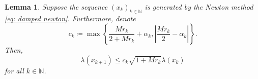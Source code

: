 \documentclass[sn-mathphys-num]{sn-jnl}%
\newcommand{\N}{\mathbb{N}}
\theoremstyle{thmstyleone}%
\newtheorem{lemma}{Lemma}[section]
\theoremstyle{thmstyletwo}%
\theoremstyle{thmstylethree}%
\numberwithin{equation}{section}
\begin{document}
\begin{lemma} \label{lemma: newton's progress lambda}
Suppose the sequence $(x_k)_{k \in \N}$ is generated by the Newton method \eqref{eq: damped newton}. Furthermore, denote 
    \begin{equation} \label{eq: def c_k}
        c_k \coloneq \max \left\lbrace \frac{M r_k }{2 + M r_k} + \alpha_k, \left| \frac{ Mr_k}{2} - \alpha_k \right| \right\rbrace.
    \end{equation}
Then, 
\begin{equation}
    \lambda(x_{k+1}) \leq c_k \sqrt{1 + M r_k} \lambda(x_k) \label{ineq: newton's progress lambda}
\end{equation}
for all $k \in \N$.
\end{lemma}
\end{document}
